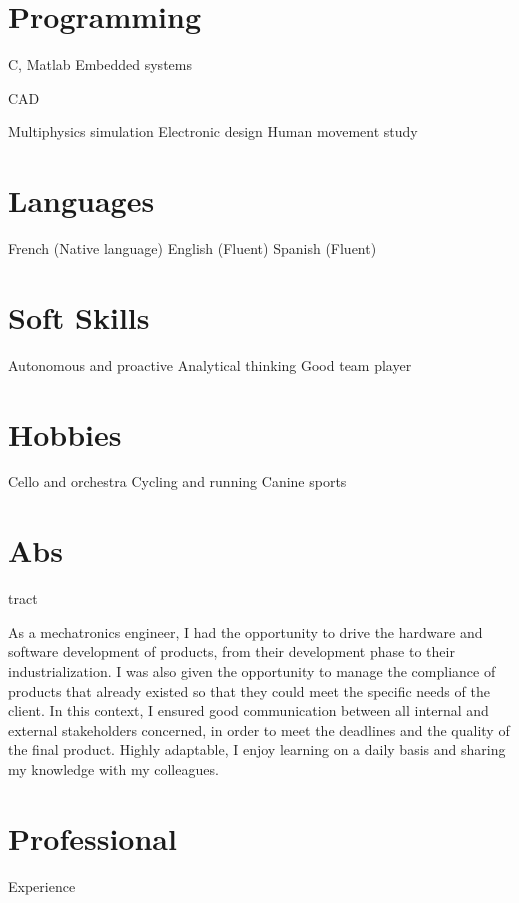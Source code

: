 \documentclass{cv-style}     %
\begin{document}
\begin{aside}
    \section{Programming}
    C, Matlab
    Embedded systems %

    CAD %

    Multiphysics simulation %
    Electronic design  %
    Human movement study %
    \section{Languages}
    French (Native language)
    English (Fluent)
    Spanish (Fluent)
    \section{Soft Skills}
    Autonomous and proactive
    Analytical thinking
    Good team player
    \section{Hobbies}
    Cello and orchestra
    Cycling and running
    Canine sports
\end{aside}

\section{Abs}{tract}

As a mechatronics engineer, I had the opportunity to drive the hardware and software development of products,
from their development phase to their industrialization. I was also given the opportunity to manage the compliance of products
that already existed so that they could meet the specific needs of the client.
In this context, I ensured good communication between all internal and external stakeholders concerned,
in order to meet the deadlines and the quality of the final product.
Highly adaptable, I enjoy learning on a daily basis and sharing my knowledge with my colleagues.

\section{Professional }{Experience}
\end{document}
